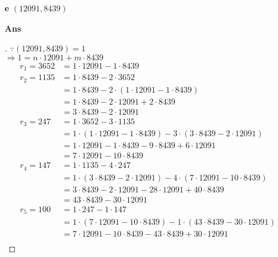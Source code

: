 \documentclass[paper=usletter, fontsize=12pt]{article}
\begin{document}
\begin{itemize}
\begin{itemize}
\begin{itemize}
                \item[\textbf{e}] $(12091, 8439)$
                \item[\textbf{Ans}]
                \begin{proof}[\unskip\nopunct]
                    $\because (12091, 8439) = 1$ \\
                    $\Rightarrow 1 = n \cdot 12091 + m \cdot 8439$
                    \begin{align*}
                        r_1 = 3652 & = 1 \cdot 12091 - 1 \cdot 8439 \\
                        r_2 = 1135 & = 1 \cdot 8439 - 2 \cdot 3652 \\
                        & = 1 \cdot 8439 - 2 \cdot (1 \cdot 12091 - 1 \cdot 8439) \\
                        & = 1 \cdot 8439 - 2 \cdot 12091 + 2 \cdot 8439 \\
                        & = 3 \cdot 8439 - 2 \cdot 12091 \\
                        r_3 = 247 & = 1 \cdot 3652 - 3 \cdot 1135 \\
                        & = 1 \cdot (1 \cdot 12091 - 1 \cdot 8439) - 3 \cdot (3 \cdot 8439 - 2 \cdot 12091) \\
                        & = 1 \cdot 12091 - 1 \cdot 8439 - 9 \cdot 8439 + 6 \cdot 12091 \\
                        & = 7 \cdot 12091 - 10 \cdot 8439 \\
                        r_4 = 147 & = 1 \cdot 1135 - 4 \cdot 247 \\
                        & = 1 \cdot (3 \cdot 8439 - 2 \cdot 12091) - 4 \cdot (7 \cdot 12091 - 10 \cdot 8439) \\
                        & = 3 \cdot 8439 - 2 \cdot 12091 - 28 \cdot 12091 + 40 \cdot 8439 \\
                        & = 43 \cdot 8439 - 30 \cdot 12091 \\
                        r_5 = 100 & = 1 \cdot 247 - 1 \cdot 147 \\
                        & = 1 \cdot (7 \cdot 12091 - 10 \cdot 8439) - 1 \cdot (43 \cdot 8439 - 30 \cdot 12091) \\
                        & = 7 \cdot 12091 - 10 \cdot 8439 - 43 \cdot 8439 + 30 \cdot 12091 \\

\end{align*}
\end{proof}
\end{itemize}
\end{itemize}
\end{itemize}
\end{document}
